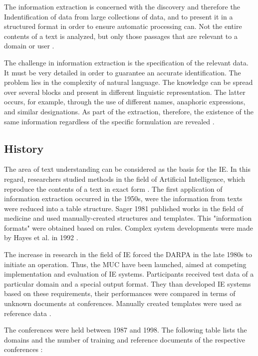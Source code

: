 The information extraction is concerned with the discovery and therefore the Indentification of data from large collections of data, and to present it in a structured format in order to ensure automatic processing can. Not the entire contents of a text is analyzed, but only those passages that are relevant to a domain or user \cite{Lehnert:1994}\cite{Neumann:2001}\cite{Siefkes:2007}.

The challenge in information extraction is the specification of the relevant data. It must be very detailed in order to guarantee an accurate identification. The problem lies in the complexity of natural language. The knowledge can be spread over several blocks and present in different linguistic representation. The latter occurs, for example, through the use of different names, anaphoric expressions, and similar designations. As part of the extraction, therefore, the existence of the same information regardless of the specific formulation are revealed \cite{Cole:1998}\cite{Grishman:2003}\cite{Grishman:2007}\cite{Linsmayr:2010}.

\newpage
\subsection{History}
The area of text understanding can be considered as the basis for the \gls{IE}. In this regard, researchers studied methods in the field of Artificial Intelligence, which reproduce the contents of a text in exact form \cite{Siefkes:2007}\cite{Eikvil:1999}. The first application of information extraction occurred in the 1950s, were  the information from texts  were reduced into a table structure. Sager 1981 published works in the field of medicine and used manually-created structures and templates. This "information formats" were obtained based on rules. Complex system developments were made by Hayes et al. in 1992 \cite{Grishman:1997}\cite{Gaizauskas:1998}\cite{Wilks:1997}.

The increase in research in the field of IE forced the \gls{DARPA} in the late 1980s to initiate an operation. Thus, the \gls{MUC} have been launched, aimed at competing implementation and evaluation of IE systems. Participants received test data of a particular domain and a special output format. They than developed IE systems based on these requirements, their performances were compared in terms of unknown documents at conferences. Manually created templates were used as reference data \cite{Grishman:1996}\cite{Grishman:1997}.

The conferences were held between 1987 and 1998. The following table lists the domains and the number of training and reference documents of the respective conferences \cite{Turmo:2006}\cite{Appelt:1999}\cite{Cunningham:2005}\cite{Linsmayr:2010}:

